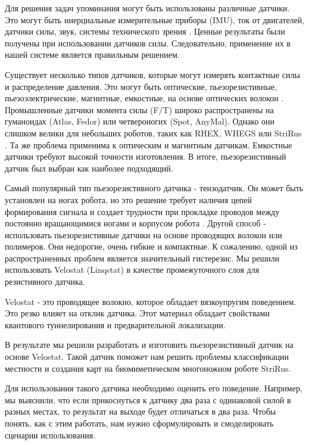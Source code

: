 Для решения задач упоминания могут быть использованы различные датчики. Это могут быть инерциальные измерительные приборы (IMU), ток от двигателей, датчики силы, звук, системы технического зрения \cite{libby_using_2012,ojeda_terrain_2006,peters_analysis_2006}. Ценные результаты были получены при использовании датчиков силы. Следовательно, применение их в нашей системе является правильным решением.

Существует несколько типов датчиков, которые могут измерять контактные силы и распределение давления. Это могут быть оптические, пьезорезистивные, пьезоэлектрические, магнитные, емкостные, на основе оптических волокон \cite{howe_dynamic_1993}. Промышленные датчики момента силы (F/T) широко распространены на гуманоидах (Atlas, Fedor) или четвероногих (Spot, AnyMal). Однако они слишком велики для небольших роботов, таких как RHEX, WHEGS или StriRus \cite{saranli_rhex_2001,schroer_comparing_2004, bulichev_concept_2018}. Та же проблема применима к оптическим и магнитным датчикам. Емкостные датчики требуют высокой точности изготовления. В итоге, пьезорезистивный датчик был выбран как наиболее подходящий.

Самый популярный тип пьезорезистивного датчика - тензодатчик. Он может быть установлен на ногах робота, но это решение требует наличия цепей формирования сигнала и создает трудности при прокладке проводов между постоянно вращающимися ногами и корпусом робота \cite{wu_tactile_2020}. Другой способ - использовать пьезорезистивные датчики на основе проводящих волокон или полимеров. Они недорогие, очень гибкие и компактные. К сожалению, одной из распространенных проблем является значительный гистерезис. Мы решили использовать Velostat (Linqstat)\cite{vehec_flexible_2020} в качестве промежуточного слоя для резистивного датчика.

Velostat - это проводящее волокно, которое обладает вязкоупругим поведением. Это резко влияет на отклик датчика. Этот материал обладает свойствами квантового туннелирования и предварительной локализации.

В результате мы решили разработать и изготовить пьезорезистивный датчик на основе Velostat. Такой датчик поможет нам решить проблемы классификации местности и создания карт на биомиметическом многоножном роботе StriRus. 

Для использования такого датчика необходимо оценить его поведение. Например, мы выяснили, что если прикоснуться к датчику два раза с одинаковой силой в разных местах, то результат на выходе будет отличаться в два раза. Чтобы понять, как с этим работать, нам нужно сформулировать и смоделировать сценарии использования.

